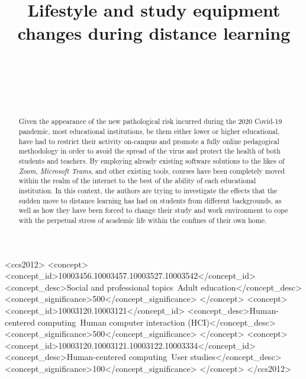 \documentclass{sigchi}
\def\plaintitle{Lifestyle and study equipment changes during distance learning}
\begin{document}
\title{\plaintitle}
\author{
  \\
  \\
  \\
  \\
}
\maketitle
\begin{abstract}
Given the appearance of the new pathological risk incurred during the 2020 Covid-19 pandemic, most educational institutions, be them either lower or higher educational, have had to restrict their activity on-campus and promote a fully online pedagogical methodology in order to avoid the spread of the virus and protect the health of both students and teachers. By employing already existing software solutions to the likes of \emph{Zoom}, \emph{Microsoft Teams}, and other existing tools, courses have been completely moved within the realm of the internet to the best of the ability of each educational institution. In this context, the authors are trying to investigate the effects that the sudden move to distance learning has had on students from different backgrounds, as well as how they have been forced to change their study and work environment to cope with the perpetual stress of academic life within the confines of their own home.
\end{abstract}



\begin{CCSXML}
<ccs2012>
<concept>
<concept_id>10003456.10003457.10003527.10003542</concept_id>
<concept_desc>Social and professional topics~Adult education</concept_desc>
<concept_significance>500</concept_significance>
</concept>
<concept>
<concept_id>10003120.10003121</concept_id>
<concept_desc>Human-centered computing~Human computer interaction (HCI)</concept_desc>
<concept_significance>500</concept_significance>
</concept>
<concept>
<concept_id>10003120.10003121.10003122.10003334</concept_id>
<concept_desc>Human-centered computing~User studies</concept_desc>
<concept_significance>100</concept_significance>
</concept>
</ccs2012>
\end{CCSXML}
\end{document}
